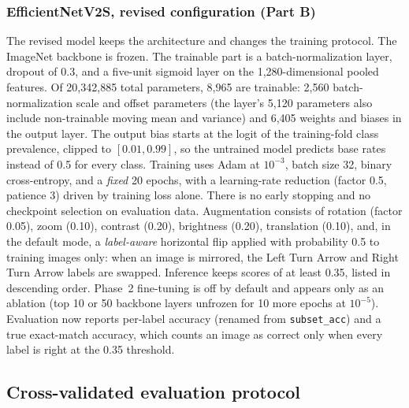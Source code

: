 \documentclass[11pt]{article}
\begin{document}
\subsubsection*{EfficientNetV2S, revised configuration (Part B)}
The revised model keeps the architecture and changes the training protocol. The ImageNet backbone is frozen. The trainable part is a batch-normalization layer, dropout of 0.3, and a five-unit sigmoid layer on the 1,280-dimensional pooled features. Of 20,342,885 total parameters, 8,965 are trainable: 2,560 batch-normalization scale and offset parameters (the layer's 5,120 parameters also include non-trainable moving mean and variance) and 6,405 weights and biases in the output layer. The output bias starts at the logit of the training-fold class prevalence, clipped to $[0.01,0.99]$, so the untrained model predicts base rates instead of 0.5 for every class. Training uses Adam at $10^{-3}$, batch size 32, binary cross-entropy, and a \emph{fixed} 20 epochs, with a learning-rate reduction (factor 0.5, patience 3) driven by training loss alone. There is no early stopping and no checkpoint selection on evaluation data. Augmentation consists of rotation (factor 0.05), zoom (0.10), contrast (0.20), brightness (0.20), translation (0.10), and, in the default mode, a \emph{label-aware} horizontal flip applied with probability 0.5 to training images only: when an image is mirrored, the Left Turn Arrow and Right Turn Arrow labels are swapped. Inference keeps scores of at least 0.35, listed in descending order. Phase~2 fine-tuning is off by default and appears only as an ablation (top 10 or 50 backbone layers unfrozen for 10 more epochs at $10^{-5}$). Evaluation now reports per-label accuracy (renamed from \texttt{subset\_acc}) and a true exact-match accuracy, which counts an image as correct only when every label is right at the 0.35 threshold.

\subsection{Cross-validated evaluation protocol}
\label{sec:cv-protocol}
\end{document}
